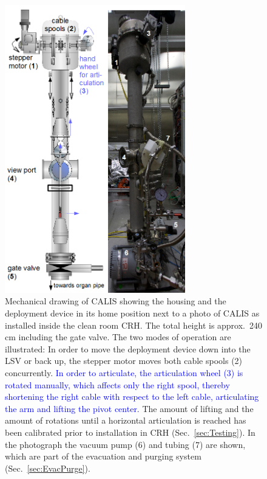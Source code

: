 \begin{figure}[htbp]
 \centering
\includegraphics[width=0.7\textwidth]{Figures/CALIS_overview.png}
 \caption{Mechanical drawing of CALIS showing the housing and the deployment device in its home position next to a photo of CALIS as installed inside the clean room CRH. The total height is approx.~240 cm including the gate valve. The two modes of operation are illustrated: In order to move the deployment device down into the LSV or back up, the stepper motor moves both cable spools (2) concurrently. \textcolor{blue}{In order to articulate, the articulation wheel (3) is rotated manually, which affects only the right spool, thereby shortening the right cable with respect to the left cable, articulating the arm and lifting the pivot center.} The amount of lifting and the amount of rotations until a horizontal articulation is reached has been calibrated prior to installation in CRH (Sec.~\ref{sec:Testing}). In the photograph the vacuum pump (6) and tubing (7) are shown, which are part of the evacuation and purging system (Sec.~\ref{sec:EvacPurge}). \label{fig:CALISDimensions}\label{fig:CALISMechanism}\label{fig:gearDrawing}\label{fig:flushing_purging}
}
\end{figure}

